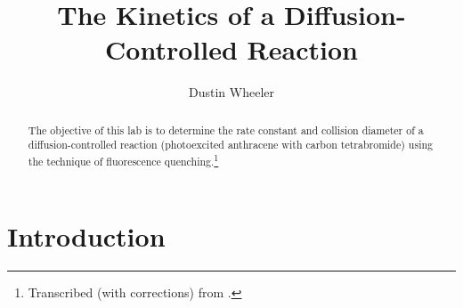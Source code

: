 \documentclass[nobib,nofonts,nols,nohyper]{tufte-handout}
\title{The Kinetics of a Diffusion-Controlled Reaction}
\author{Dustin Wheeler}
\begin{document}
\maketitle%

\begin{abstract}
\noindent
The objective of this lab is to determine the rate constant and collision diameter of a diffusion-controlled reaction (photoexcited anthracene with carbon tetrabromide) using the technique of fluorescence quenching.\thanks{Transcribed (with corrections) from \textcite{halpern97}.}
\end{abstract}



\section{Introduction} %
\label{sec:intro}
\end{document}
